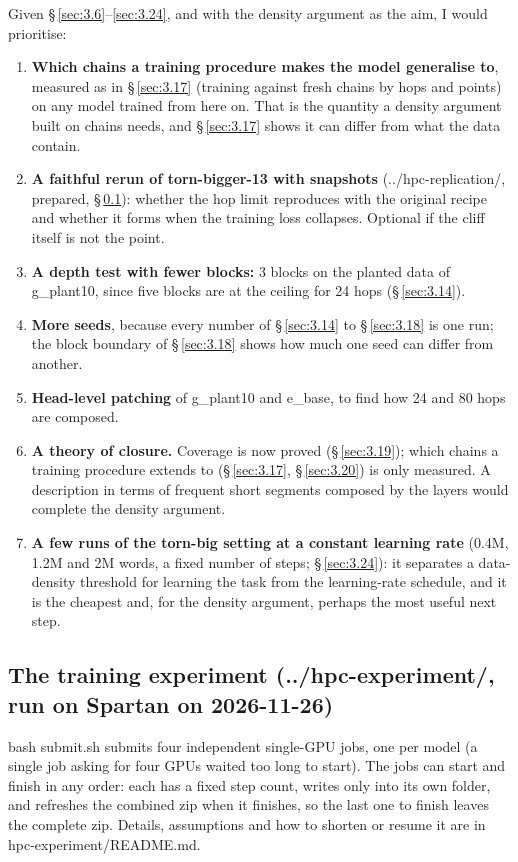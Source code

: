 \documentclass[paper=a4,fontsize=11pt,DIV=11,parskip=half,headings=small,numbers=noendperiod]{scrartcl}
\DeclareRobustCommand{\lead}[1]{\textsf{\bfseries\color{accent}#1}}
\DeclareRobustCommand{\code}[1]{{\fontseries{m}\ttfamily #1}}
\begin{document}
Given \S\,\ref{sec:3.6}–\ref{sec:3.24}, and with the density argument as the aim, I would prioritise:

\begin{enumerate}
\item \lead{Which chains a training procedure makes the model generalise to}, measured as in \S\,\ref{sec:3.17}
  (training against fresh chains by hops and points) on any model trained from here on. That is the quantity a
  density argument built on chains needs, and \S\,\ref{sec:3.17} shows it can differ from what the data contain.
\item \lead{A faithful rerun of \code{torn-\allowbreak{}bigger-\allowbreak{}13} with snapshots}
  (\code{../\allowbreak{}hpc-\allowbreak{}replication/}, prepared, \S\,\ref{sec:6.1}): whether the hop limit
  reproduces with the original recipe and whether it forms when the training loss collapses. Optional if the
  cliff itself is not the point.
\item \lead{A depth test with fewer blocks:} 3 blocks on the planted data of \code{g\_\allowbreak{}plant10},
  since five blocks are at the ceiling for 24 hops (\S\,\ref{sec:3.14}).
\item \lead{More seeds}, because every number of \S\,\ref{sec:3.14} to \S\,\ref{sec:3.18} is one run; the block
  boundary of \S\,\ref{sec:3.18} shows how much one seed can differ from another.
\item \lead{Head-level patching} of \code{g\_\allowbreak{}plant10} and \code{e\_\allowbreak{}base}, to find how
  24 and 80 hops are composed.
\item \lead{A theory of closure.} Coverage is now proved (\S\,\ref{sec:3.19}); which chains a training procedure
  extends to (\S\,\ref{sec:3.17}, \S\,\ref{sec:3.20}) is only measured. A description in terms of frequent short
  segments composed by the layers would complete the density argument.
\item \lead{A few runs of the \code{torn-\allowbreak{}big} setting at a constant learning rate} (0.4M, 1.2M and
  2M words, a fixed number of steps; \S\,\ref{sec:3.24}): it separates a data-density threshold for learning the
  task from the learning-rate schedule, and it is the cheapest and, for the density argument, perhaps the most
  useful next step.
\end{enumerate}

\subsection{The training experiment
(\texorpdfstring{\code{../\allowbreak{}hpc-\allowbreak{}experiment/}}{../hpc-experiment/}, run on Spartan on
2026-11-26)}\label{sec:6.1}
\code{bash submit.\allowbreak{}sh} submits four independent single-GPU jobs, one per model (a single job asking
for four GPUs waited too long to start). The jobs can start and finish in any order: each has a fixed step
count, writes only into its own folder, and refreshes the combined zip when it finishes, so the last one to
finish leaves the complete zip. Details, assumptions and how to shorten or resume it are in
\code{hpc-\allowbreak{}experiment/\allowbreak{}README.\allowbreak{}md}.
\end{document}
